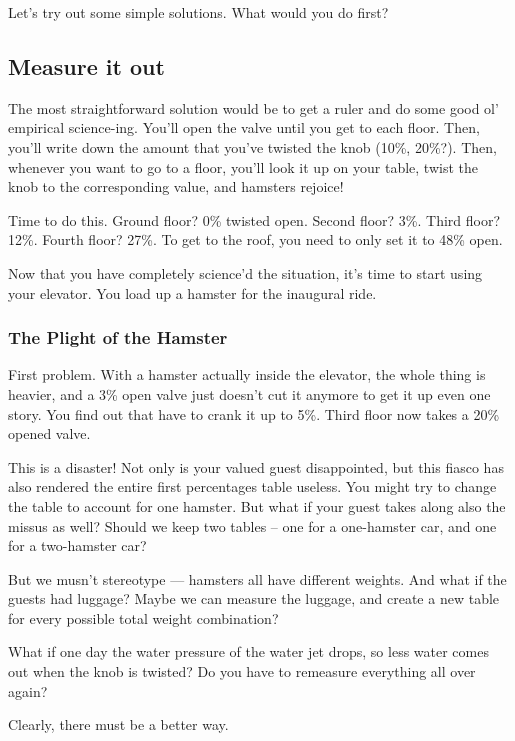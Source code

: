 \documentclass[]{article}
\begin{document}
Let's try out some simple solutions. What would you do first?

\subsection{Measure it out}\label{measure-it-out}

The most straightforward solution would be to get a ruler and do some
good ol' empirical science-ing. You'll open the valve until you get to
each floor. Then, you'll write down the amount that you've twisted the
knob (10\%, 20\%?). Then, whenever you want to go to a floor, you'll
look it up on your table, twist the knob to the corresponding value, and
hamsters rejoice!

Time to do this. Ground floor? 0\% twisted open. Second floor? 3\%.
Third floor? 12\%. Fourth floor? 27\%. To get to the roof, you need to
only set it to 48\% open.

Now that you have completely science'd the situation, it's time to start
using your elevator. You load up a hamster for the inaugural ride.

\subsubsection{The Plight of the
Hamster}\label{the-plight-of-the-hamster}

First problem. With a hamster actually inside the elevator, the whole
thing is heavier, and a 3\% open valve just doesn't cut it anymore to
get it up even one story. You find out that have to crank it up to 5\%.
Third floor now takes a 20\% opened valve.

This is a disaster! Not only is your valued guest disappointed, but this
fiasco has also rendered the entire first percentages table useless. You
might try to change the table to account for one hamster. But what if
your guest takes along also the missus as well? Should we keep two
tables -- one for a one-hamster car, and one for a two-hamster car?

But we musn't stereotype --- hamsters all have different weights. And
what if the guests had luggage? Maybe we can measure the luggage, and
create a new table for every possible total weight combination?

What if one day the water pressure of the water jet drops, so less water
comes out when the knob is twisted? Do you have to remeasure everything
all over again?

Clearly, there must be a better way.
\end{document}
